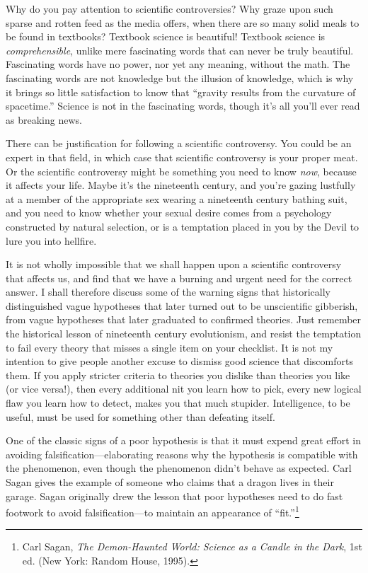\hr

{
 Why do you pay attention to scientific controversies? Why graze
upon such sparse and rotten feed as the media offers, when there are so
many solid meals to be found in textbooks? Textbook science is
beautiful! Textbook science is \textit{comprehensible}, unlike mere
fascinating words that can never be truly beautiful. Fascinating words
have no power, nor yet any meaning, without the math. The fascinating
words are not knowledge but the illusion of knowledge, which is why it
brings so little satisfaction to know that ``gravity
results from the curvature of spacetime.'' Science is
not in the fascinating words, though it's all
you'll ever read as breaking news.}

{
 There can be justification for following a scientific controversy.
You could be an expert in that field, in which case that scientific
controversy is your proper meat. Or the scientific controversy might be
something you need to know \textit{now}, because it affects your life.
Maybe it's the nineteenth century, and
you're gazing lustfully at a member of the appropriate
sex wearing a nineteenth century bathing suit, and you need to know
whether your sexual desire comes from a psychology constructed by
natural selection, or is a temptation placed in you by the Devil to
lure you into hellfire.}

{
 It is not wholly impossible that we shall happen upon a scientific
controversy that affects us, and find that we have a burning and urgent
need for the correct answer. I shall therefore discuss some of the
warning signs that historically distinguished vague hypotheses that
later turned out to be unscientific gibberish, from vague hypotheses
that later graduated to confirmed theories. Just remember the
historical lesson of nineteenth century evolutionism, and resist the
temptation to fail every theory that misses a single item on your
checklist. It is not my intention to give people another excuse to
dismiss good science that discomforts them. If you apply stricter
criteria to theories you dislike than theories you like (or vice
versa!), then every additional nit you learn how to pick, every new
logical flaw you learn how to detect, makes you that much stupider.
Intelligence, to be useful, must be used for something other than
defeating itself.}

\hr

{
 One of the classic signs of a poor hypothesis is that it must
expend great effort in avoiding falsification---elaborating reasons why
the hypothesis is compatible with the phenomenon, even though the
phenomenon didn't behave as expected. Carl Sagan gives
the example of someone who claims that a dragon lives in their garage.
Sagan originally drew the lesson that poor hypotheses need to do fast
footwork to avoid falsification---to maintain an appearance of
``fit.''\footnote{Carl Sagan, \textit{The Demon-Haunted World: Science as a
Candle in the Dark}, 1st ed. (New York: Random House, 1995).}}

